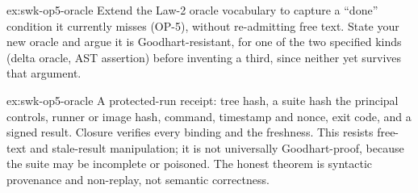 \documentclass[11pt,a4paper]{article}
\theoremstyle{definition}
\theoremstyle{remark}
\begin{document}
\begin{pdexercise}[kind=Open,rating=3]{ex:swk-op5-oracle}
Extend the Law-2 oracle vocabulary to capture a ``done'' condition it currently misses (OP-5), without re-admitting free text. State your new oracle and argue it is Goodhart-resistant, for one of the two specified kinds (delta oracle, AST assertion) before inventing a third, since neither yet survives that argument.
\end{pdexercise}
\begin{pdsolution}{ex:swk-op5-oracle}
A protected-run receipt: tree hash, a suite hash the principal controls, runner or image hash, command, timestamp and nonce, exit code, and a signed result. Closure verifies every binding and the freshness. This resists free-text and stale-result manipulation; it is not universally Goodhart-proof, because the suite may be incomplete or poisoned. The honest theorem is syntactic provenance and non-replay, not semantic correctness.
\end{pdsolution}

\end{document}
